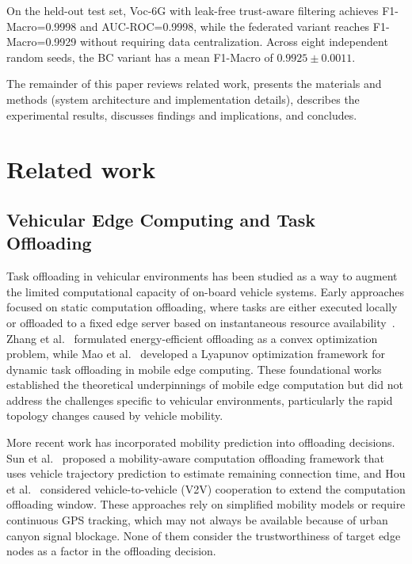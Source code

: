 \documentclass[10pt,letterpaper]{article}
\providecommand{\VocSixG}{Voc-6G}
\begin{document}
On the held-out test set, \VocSixG{} with leak-free trust-aware filtering achieves F1-Macro=0.9998 and AUC-ROC=0.9998, while the federated variant reaches F1-Macro=0.9929 without requiring data centralization. Across eight independent random seeds, the BC variant has a mean F1-Macro of $0.9925 \pm 0.0011$.

The remainder of this paper reviews related work, presents the materials and methods (system architecture and implementation details), describes the experimental results, discusses findings and implications, and concludes.


\section*{Related work}
\label{sec:related}

\subsection*{Vehicular Edge Computing and Task Offloading}

Task offloading in vehicular environments has been studied as a way to augment the limited computational capacity of on-board vehicle systems. Early approaches focused on static computation offloading, where tasks are either executed locally or offloaded to a fixed edge server based on instantaneous resource availability~\cite{chen2019computation, mao2017mobile}. Zhang et al.~\cite{zhang2015energy} formulated energy-efficient offloading as a convex optimization problem, while Mao et al.~\cite{mao2017mobile} developed a Lyapunov optimization framework for dynamic task offloading in mobile edge computing. These foundational works established the theoretical underpinnings of mobile edge computation but did not address the challenges specific to vehicular environments, particularly the rapid topology changes caused by vehicle mobility.

More recent work has incorporated mobility prediction into offloading decisions. Sun et al.~\cite{sun2021toward} proposed a mobility-aware computation offloading framework that uses vehicle trajectory prediction to estimate remaining connection time, and Hou et al.~\cite{hou2018mobile} considered vehicle-to-vehicle (V2V) cooperation to extend the computation offloading window. These approaches rely on simplified mobility models or require continuous GPS tracking, which may not always be available because of urban canyon signal blockage. None of them consider the trustworthiness of target edge nodes as a factor in the offloading decision.
\end{document}
